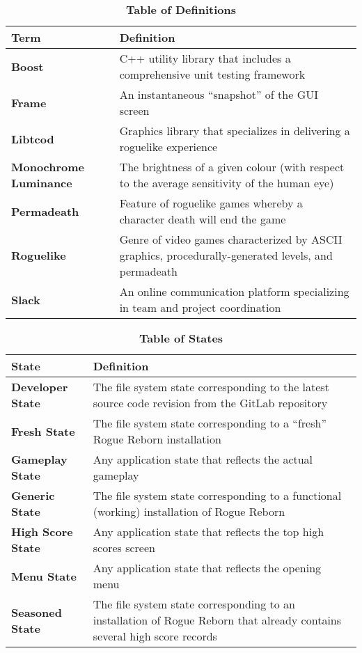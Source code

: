 \documentclass[12pt, titlepage]{article}
\begin{document}
		\begin{table}[H]
			\centering
			\caption{\textbf{Table of Definitions}}
			\label{TableDefinitions}
			\bigskip
			\begin{tabularx}{\textwidth}{p{3.5cm}X}
				\toprule
				\textbf{Term} & \textbf{Definition}\\
				\midrule
				\textbf{Boost} & C++ utility library that includes a comprehensive unit testing framework\\
				\textbf{Frame} & An instantaneous ``snapshot'' of the GUI screen\\
				\textbf{Libtcod} & Graphics library that specializes in delivering a roguelike experience\\
				\textbf{Monochrome Luminance} & The brightness of a given colour (with respect to the average sensitivity of the human eye)\\
				\textbf{Permadeath} & Feature of roguelike games whereby a character death will end the game\\
				\textbf{Roguelike} & Genre of video games characterized by ASCII graphics, procedurally-generated levels, and permadeath\\
				\textbf{Slack} & An online communication platform specializing in team and project coordination\\ 
				\bottomrule
			\end{tabularx}
		\end{table}	

		\begin{table}[H]
			\centering
			\caption{\textbf{Table of States}}
			\label{StateDefinitions}
			\bigskip
			\begin{tabularx}{\textwidth}{p{3.5cm}X}
				\toprule
				\textbf{State} & \textbf{Definition}\\
				\midrule
				\textbf{Developer State} & The file system state corresponding to the latest source code revision from the GitLab repository\\
				\textbf{Fresh State} & The file system state corresponding to a ``fresh'' Rogue Reborn installation\\
				\textbf{Gameplay State} & Any application state that reflects the actual gameplay\\
				\textbf{Generic State} & The file system state corresponding to a functional (working) installation of Rogue Reborn\\
				\textbf{High Score State} & Any application state that reflects the top high scores screen\\
				\textbf{Menu State} & Any application state that reflects the opening menu\\
				\textbf{Seasoned State} & The file system state corresponding to an installation of Rogue Reborn that already contains several high score records\\
				\bottomrule
			\end{tabularx}
		\end{table}	
\end{document}
